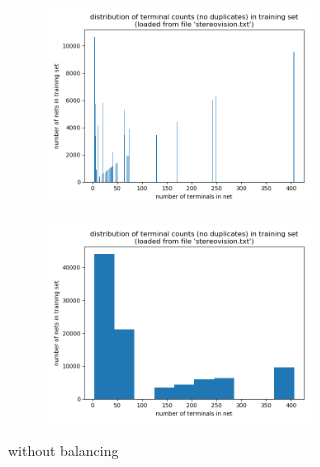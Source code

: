 \begin{figure}
	\centering
	\begin{subfigure}[b]{0.49\linewidth}
		\begin{subfigure}[b]{\linewidth}
			\includegraphics[width=\linewidth]{plots/data-distribution-full-fine.png}
		\end{subfigure}
		\begin{subfigure}[b]{\linewidth}
			\includegraphics[width=\linewidth]{plots/data-distribution-full-coarse.png}
		\end{subfigure}
		\caption{without balancing}
	\end{subfigure}
	\begin{subfigure}[b]{0.49\linewidth}
		\begin{subfigure}[b]{\linewidth}

\end{subfigure}
\end{subfigure}
\end{figure}
